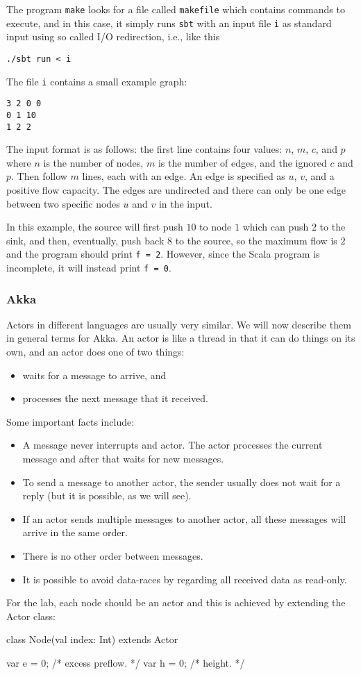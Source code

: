 \documentclass{forsete}
\begin{document}
{The program {\tt make} looks for a file called {\tt makefile} which contains commands to execute, and in this
case, it simply runs {\tt sbt} with an input file {\tt i} as standard input using so called I/O redirection, i.e.,
like this
\begin{verbatim}
./sbt run < i
\end{verbatim}
The file {\tt i} contains a small example graph:
\begin{verbatim}
3 2 0 0
0 1 10
1 2 2
\end{verbatim}
The input format is as follows: the first line contains four values: $n$, $m$, $c$, and $p$ where $n$ is the number of nodes, $m$ is the number of edges, and the ignored $c$ and $p$.
Then follow $m$ lines, each with an edge. An edge is specified as $u$, $v$, and a positive flow capacity. The edges
are undirected and there can only be one edge between two specific nodes $u$ and $v$ in the input.

In this example, the source will first push $10$ to node $1$ which can push $2$ to the sink, and then, eventually,
push back $8$ to the source, so the maximum flow is $2$ and the program should print {\tt f = 2}.
However, since the Scala program is incomplete, it will instead print {\tt f = 0}.

\subsubsection*{Akka}
Actors in different languages are usually very similar. We will now describe them in general terms for Akka.
An actor is like a thread in that it can do things on its own, and an actor does one of two things:
\begin{itemize}
\item waits for a message to arrive, and
\item processes the next message that it received.
\end{itemize}
Some important facts include:
\begin{itemize}
\item A message never interrupts and actor. The actor processes the current message and after that waits for new
messages.
\item To send a message to another actor, the sender usually does not wait for a reply (but it is possible, as we will see).
\item If an actor sends multiple messages to another actor, all these messages will arrive in the same order. 
\item There is no other order between messages.
\item It is possible to avoid data-races by regarding all received data as read-only.
\end{itemize}
For the lab, each node should be an actor and this is achieved by extending the Actor class:
\begin{ccode}
class Node(val index: Int) extends Actor {
	var	e = 0;				/* excess preflow. 						*/
	var	h = 0;				/* height. 							*/
   
}
\end{ccode}}
\end{document}
